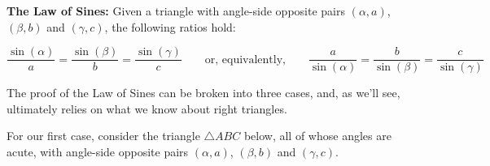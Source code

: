 \documentclass{ximera}
\begin{document}
 


\begin{theorem}  \label{lawofsines}  \textbf{The Law of Sines:}  Given a triangle with angle-side opposite pairs $(\alpha, a)$, $(\beta, b)$ and $(\gamma, c)$, the following ratios hold:


\[ \frac{\sin(\alpha)}{a} = \frac{\sin(\beta)}{b} = \frac{\sin(\gamma)}{c} \qquad \text{or, equivalently,} \qquad  \frac{a}{\sin(\alpha)} = \frac{b}{\sin(\beta)}  = \frac{c}{\sin(\gamma)} \]

 

\end{theorem}

 

The proof of the Law of Sines can be broken into three cases, and, as we'll see, ultimately relies on what we know about right triangles. 

 

For our first case, consider the triangle $\triangle ABC$ below, all of whose angles are acute, with angle-side opposite pairs $(\alpha, a)$, $(\beta, b)$ and $(\gamma, c)$. 

 
\end{document}
